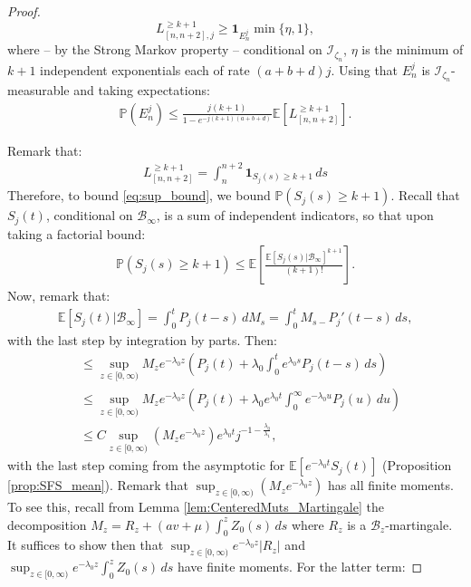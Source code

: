 \documentclass{article}
\numberwithin{equation}{section}
\begin{document}
\begin{proof}
  \[L_{[n,n+2],j}^{\geq k+1}\geq \mathbf{1}_{E_n^j}\min\{\eta,1\},\]
  where -- by the Strong Markov property -- conditional on $\mathcal{I}_{\zeta_n}$, $\eta$ is the minimum of $k+1$ independent exponentials each of rate $(a+b+d)j$. Using that $E_n^j$ is $\mathcal{I}_{\zeta_n}$-measurable and taking expectations:
  \begin{align}
    \mathbb{P}(E_n^j)\leq \frac{j(k+1)}{1-e^{-j(k+1)(a+b+d)}}\mathbb{E}[L_{[n,n+2]}^{\geq k+1}].\label{eq:sup_bound}
  \end{align}

  Remark that:
  \begin{align}
    L_{[n,n+2]}^{\geq k+1}=\int_n^{n+2}\mathbf{1}_{S_{j}(s)\geq k+1}\,ds\label{eq:local_time_decomposition}
  \end{align}
  Therefore, to bound \ref{eq:sup_bound}, we bound $\mathbb{P}(S_{j}(s)\geq k+1)$. Recall that $S_{j}(t)$, conditional on $\mathcal{B}_\infty$, is a sum of independent indicators, so that upon taking a factorial bound:
    \begin{align}
        \mathbb{P}(S_{j}(s)\geq k+1)\leq \mathbb{E}\left[\frac{\mathbb{E}[S_{j}(s)|\mathcal{B}_\infty]^{k+1}}{(k+1)!}\right].\label{eq:factorial_bound}
    \end{align}
    Now, remark that:
    \begin{align*}
        \mathbb{E}[S_j(t)|\mathcal{B}_\infty]=\int_0^t P_j(t-s)\,dM_s=\int_0^t M_{s-}P_j'(t-s)\,ds,
    \end{align*}
    with the last step by integration by parts. Then:
    \begin{align}
        &\leq  \sup_{z\in [0,\infty)} M_ze^{-\lambda_0 z}\left(P_j(t)+\lambda_0\int_0^t e^{\lambda_0 s}P_j(t-s)\,ds\right)\nonumber\\
        &\leq  \sup_{z\in [0,\infty)} M_ze^{-\lambda_0 z}\left(P_j(t)+\lambda_0 e^{\lambda_0 t}\int_0^\infty e^{-\lambda_0 u}P_j(u)\,du\right)\nonumber\\
        &\leq C\sup_{z\in [0,\infty)} \left(M_ze^{-\lambda_0 z}\right) e^{\lambda_0 t}j^{-1-\frac{\lambda_0}{\lambda_1}},\label{eq:S_j_expectation_bound}
    \end{align}
    with the last step coming from the asymptotic for $\mathbb{E}[e^{-\lambda_0 t}S_j(t)]$ (Proposition \ref{prop:SFS_mean}). Remark that $\sup_{z\in [0,\infty)}\left(M_z e^{-\lambda_0 z}\right)$ has all finite moments. To see this, recall from Lemma \ref{lem:CenteredMuts_Martingale} the decomposition $M_z=R_z+(av+\mu)\int_0^z Z_0(s)\,ds$ where $R_z$ is a $\mathcal{B}_z$-martingale. It suffices to show then that $\sup_{z\in [0,\infty)}e^{-\lambda_0 z}|R_z|$ and $\sup_{z\in [0,\infty)}e^{-\lambda_0 z}\int_0^z Z_0(s)\,ds$ have finite moments. For the latter term:


\end{proof}
\end{document}
